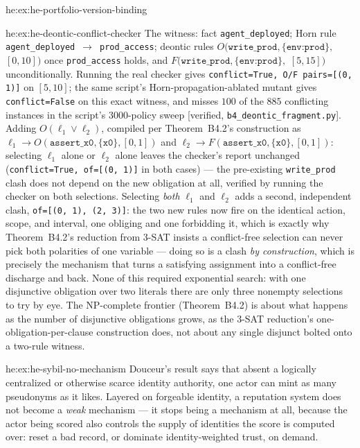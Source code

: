 \begin{pdSolution}{he:ex:he-portfolio-version-binding}
\end{pdSolution}
\begin{pdSolution}{he:ex:he-deontic-conflict-checker}
The witness: fact \texttt{agent\_deployed}; Horn rule
\texttt{agent\_deployed}~$\to$~\texttt{prod\_access}; deontic rules
$O(\texttt{write\_prod},\{\texttt{env:prod}\},$ $[0,10])$ once \texttt{prod\_access}
holds, and $F(\texttt{write\_prod},\{\texttt{env:prod}\},$ $[5,15])$ unconditionally.
Running the real checker gives \texttt{conflict=True, O/F pairs=[(0, 1)]} on
$[5,10]$; the same script's Horn-propagation-ablated mutant gives
\texttt{conflict=False} on this exact witness, and misses $100$ of the $885$
conflicting instances in the script's $3000$-policy sweep [verified,
\texttt{b4\_deontic\_fragment.py}]. Adding $O(\ell_1\vee\ell_2)$, compiled per
Theorem~B4.2's construction as $\ell_1\to O(\texttt{assert\_x0},\{\texttt{x0}\},[0,1])$
and $\ell_2\to F(\texttt{assert\_x0},\{\texttt{x0}\},[0,1])$: selecting $\ell_1$
alone or $\ell_2$ alone leaves the checker's report unchanged
(\texttt{conflict=True, of=[(0, 1)]} in both cases) --- the pre-existing
\texttt{write\_prod} clash does not depend on the new obligation at all, verified
by running the checker on both selections. Selecting \emph{both} $\ell_1$ and
$\ell_2$ adds a second, independent clash, \texttt{of=[(0, 1), (2, 3)]}: the two
new rules now fire on the identical action, scope, and interval, one obliging
and one forbidding it, which is exactly why Theorem~B4.2's reduction from 3-SAT
insists a conflict-free selection can never pick both polarities of one
variable --- doing so is a clash \emph{by construction}, which is precisely the
mechanism that turns a satisfying assignment into a conflict-free discharge and
back. None of this required exponential search: with one disjunctive obligation
over two literals there are only three nonempty selections to try by eye. The
NP-complete frontier (Theorem~B4.2) is about what happens as the number of
disjunctive obligations grows, as the $3$-SAT reduction's one-obligation-per-clause
construction does, not about any single disjunct bolted onto a two-rule
witness.
\end{pdSolution}
\begin{pdSolution}{he:ex:he-sybil-no-mechanism}
Douceur's result says that absent a logically centralized or otherwise
scarce identity authority, one actor can mint as many pseudonyms as it likes.
Layered on forgeable identity, a reputation system does not become a
\emph{weak} mechanism --- it stops being a mechanism at all, because the actor
being scored also controls the supply of identities the score is computed over:
reset a bad record, or dominate identity-weighted trust, on demand.
\end{pdSolution}
